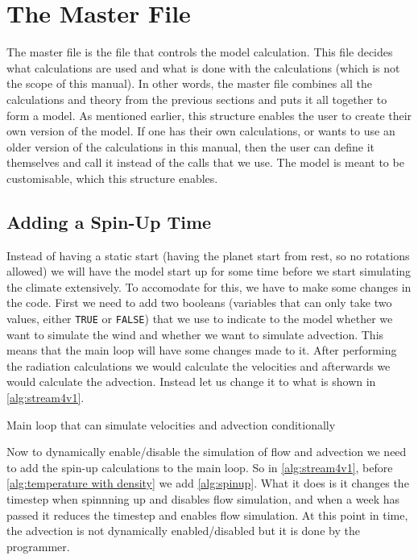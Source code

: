 \section{The Master File}
The master file is the file that controls the model calculation. This file decides what calculations are used and  what is done with the calculations (which is not the scope of this manual).
In other words, the master file combines all the calculations and theory from the previous sections and puts it all together to form a model. As mentioned earlier, this structure enables the 
user to create their own version of the model. If one has their own calculations, or wants to use an older version of the calculations in this manual, then the user can define it themselves
and call it instead of the calls that we use. The model is meant to be customisable, which this structure enables.

\subsection{Adding a Spin-Up Time}
Instead of having a static start (having the planet start from rest, so no rotations allowed) we will have the model start up for some time before we start simulating the climate extensively.
To accomodate for this, we have to make some changes in the code. First we need to add two booleans (variables that can only take two values, either \texttt{TRUE} or \texttt{FALSE}) that we use
to indicate to the model whether we want to simulate the wind and whether we want to simulate advection. This means that the main loop will have some changes made to it. After performing the 
radiation calculations we would calculate the velocities and afterwards we would calculate the advection. Instead let us change it to what is shown in 
\autoref{alg:stream4v1}.

\begin{algorithm}
    \caption{Main loop that can simulate velocities and advection conditionally}
    \label{alg:stream4v1}
\end{algorithm}

Now to dynamically enable/disable the simulation of flow and advection we need to add the spin-up calculations to the main loop. So in \autoref{alg:stream4v1}, before 
\autoref{alg:temperature with density} we add \autoref{alg:spinup}. What it does is it changes the timestep when spinnning up and disables flow simulation, and when a week has passed it reduces 
the timestep and enables flow simulation. At this point in time, the advection is not dynamically enabled/disabled but it is done by the programmer.

